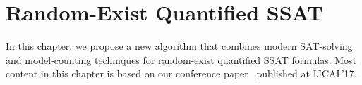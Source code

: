 \chapter{Random-Exist Quantified SSAT}
\label{chap:random-exist-ssat}

In this chapter, we propose a new algorithm that combines modern SAT-solving and model-counting techniques for random-exist quantified SSAT formulas.
Most content in this chapter is based on our conference paper~\cite{LeeIJCAI17RESSAT} published at IJCAI\,'17.



